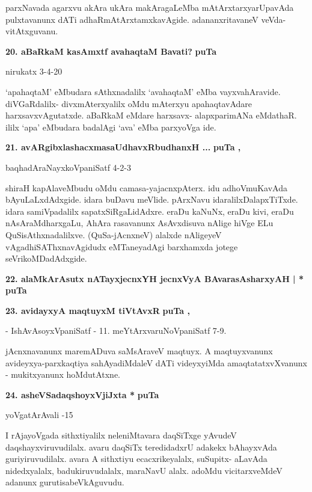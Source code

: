 \smallskip
parxNavada agarxvu akAra ukAra makAragaLeMba mAtArxtarxyarUpavAda pulxtavanunx dATi adhaRmAtArxtamxkavAgide. adananxritavaneV veVda-vitAtxguvanu.

\medskip
\noindent
\textbf{20. aBaRkaM kasAmxtf avahaqtaM Bavati?} \hfill{\bf puTa \pageref{224}}

\hfill{nirukatx 3-4-20}

\smallskip
`apahaqtaM' eMbudara sAthxnadalilx `avahaqtaM' eMba vayxvahAravide. diVGaR\-dalilx- divxmAterxyalilx oMdu mAterxyu apahaqtavAdare harxsavxvAgutatxde. aBaRkaM eMdare harxsavx- alapxparimANa eMdathaR. ililx `apa' eMbudara badalAgi `ava' eMba parxyoVga ide.

\medskip
\noindent
\textbf{21. avARgibxlashacxmasaUdhavxRbudhanxH ...} \hfill{\bf puTa \pageref{92}, \pageref{152}}

\hfill{baqhadAraNayxkoVpaniSatf 4-2-3}

\smallskip
shiraH kapAlaveMbudu oMdu camasa-yajacnxpAterx. idu adhoVmuKavAda bAyuLaLxdAdxgide. idara buDavu meVlide. pArxNavu idaralilxDalapxTiTxde. idara samiVpadalilx sapatxSiRgaLidAdxre. eraDu kaNuNx, eraDu kivi, eraDu nAsAraMdharx\-gaLu, AhAra rasavanunx AsAvxdisuva nAlige hiVge ELu QuSisAthxnadalilxve. (QuSa-\-jAcnxneV) alalxde nAligeyeV vAgadhiSAThxnavAgidudx eMTaneyadAgi barxhamxda jotege seVrikoMDa\-dAdxgide.

\medskip
\noindent
\textbf{22. alaMkArAsutx nATayxjecnxYH jecnxVyA BAvarasAsharxyAH | *} \hfill{\bf puTa \pageref{245}}

\medskip
\noindent
\textbf{23. avidayxyA maqtuyxM tiVtAvxR} \hfill{\bf puTa \pageref{160}, \pageref{161}}

\smallskip
\hfill{- IshAvAsoyxVpaniSatf - 11. meYtArxvaruNoVpaniSatf 7-9.}

\smallskip
jAcnxnavanunx maremADuva saMsAraveV maqtuyx. A maqtuyxvanunx avideyxya-\-parxkaqtiya sahAya\-diMdaleV dATi videyxyiMda amaqtatatxvXvanunx - mukitxyanunx hoMdutAtxne.

\medskip
\noindent
\textbf{24. asheVSadaqshoyxVjiJxta *} \hfill{\bf puTa \pageref{128}}

\hfill{yoVgatArAvali -15}

\smallskip
I rAjayoVgada sithxtiyalilx neleniMtavara daqSiTxge yAvudeV daqshayxviruvu\-dilalx. avaru daqSiTx tere\-didadxrU adakekx bAhayxvAda guriyiruvudilalx. avara A sithxtiyu ecacxrikeyalalx, suSupitx- aLavAda nidedx\-yalalx, badukiruvudalalx, maraNavU alalx. adoMdu vicitarxveMdeV adanunx gurutisabeVkAguvudu.

